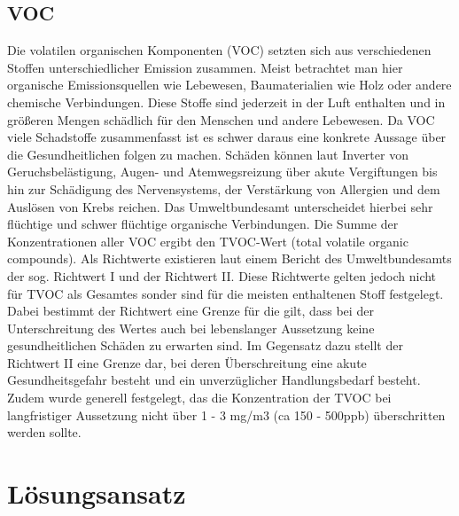 \documentclass[]{article}
\begin{document}
		\subsection{VOC}
			Die volatilen organischen Komponenten (VOC) setzten sich aus verschiedenen Stoffen unterschiedlicher Emission zusammen. Meist betrachtet man hier organische Emissionsquellen wie Lebewesen, Baumaterialien wie Holz oder andere chemische Verbindungen. Diese Stoffe sind jederzeit in der Luft enthalten und in größeren Mengen schädlich für den Menschen und andere Lebewesen. Da VOC viele Schadstoffe zusammenfasst ist es schwer daraus eine konkrete Aussage über die Gesundheitlichen folgen zu machen. Schäden können laut Inverter \cite{luftquali_inventer} von Geruchsbelästigung, Augen- und Atemwegsreizung  über akute Vergiftungen bis hin zur Schädigung des Nervensystems, der Verstärkung von Allergien und dem Auslösen von Krebs reichen. Das Umweltbundesamt \cite{luftquali_bund_voc} unterscheidet hierbei sehr flüchtige und schwer flüchtige organische Verbindungen. Die Summe der Konzentrationen aller VOC ergibt den TVOC-Wert (total volatile organic compounds). Als Richtwerte existieren laut einem Bericht des Umweltbundesamts \cite{luftquali_bund_rw} der sog. Richtwert I und der Richtwert II. Diese Richtwerte gelten jedoch nicht für TVOC als Gesamtes sonder sind für die meisten enthaltenen Stoff festgelegt. Dabei bestimmt der Richtwert eine Grenze für die gilt, dass bei der Unterschreitung des Wertes auch bei lebenslanger Aussetzung keine gesundheitlichen Schäden zu erwarten sind. Im Gegensatz dazu stellt der Richtwert II eine Grenze dar, bei deren Überschreitung eine akute Gesundheitsgefahr besteht und ein unverzüglicher Handlungsbedarf besteht. Zudem wurde generell festgelegt, das die Konzentration der TVOC bei langfristiger Aussetzung nicht über 1 - 3 mg/m3 (ca 150 - 500ppb) überschritten werden sollte.
	\section{Lösungsansatz} %
\end{document}
